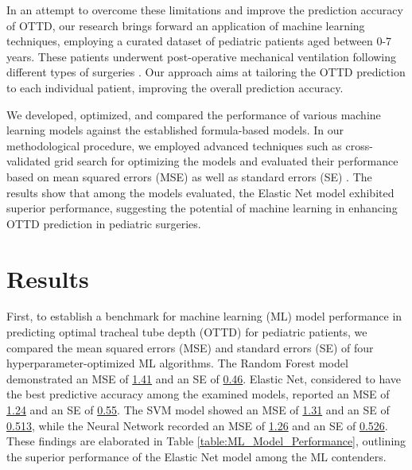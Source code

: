 \documentclass[11pt]{article}
\begin{document}
In an attempt to overcome these limitations and improve the prediction accuracy of OTTD, our research brings forward an application of machine learning techniques, employing a curated dataset of pediatric patients aged between 0-7 years. These patients underwent post-operative mechanical ventilation following different types of surgeries \cite{Kerrey2009APC, Jagannathan2011ACE}. Our approach aims at tailoring the OTTD prediction to each individual patient, improving the overall prediction accuracy. 

We developed, optimized, and compared the performance of various machine learning models against the established formula-based models. In our methodological procedure, we employed advanced techniques such as cross-validated grid search for optimizing the models and evaluated their performance based on mean squared errors (MSE) as well as standard errors (SE) \cite{Wu2019HyperparameterOF, Marco2011DataMM}. The results show that among the models evaluated, the Elastic Net model exhibited superior performance, suggesting the potential of machine learning in enhancing OTTD prediction in pediatric surgeries.

\section*{Results}

First, to establish a benchmark for machine learning (ML) model performance in predicting optimal tracheal tube depth (OTTD) for pediatric patients, we compared the mean squared errors (MSE) and standard errors (SE) of four hyperparameter-optimized ML algorithms. The Random Forest model demonstrated an MSE of \hyperlink{A0a}{1.41} and an SE of \hyperlink{A0b}{0.46}. Elastic Net, considered to have the best predictive accuracy among the examined models, reported an MSE of \hyperlink{A1a}{1.24} and an SE of \hyperlink{A1b}{0.55}. The SVM model showed an MSE of \hyperlink{A2a}{1.31} and an SE of \hyperlink{A2b}{0.513}, while the Neural Network recorded an MSE of \hyperlink{A3a}{1.26} and an SE of \hyperlink{A3b}{0.526}. These findings are elaborated in Table \ref{table:ML_Model_Performance}, outlining the superior performance of the Elastic Net model among the ML contenders.
\end{document}
